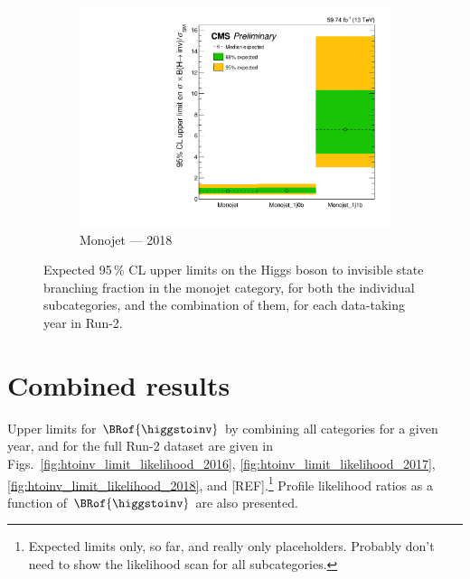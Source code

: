 \begin{figure}[htbp]
    \begin{subfigure}[b]{0.45\textwidth}
        \includegraphics[width=\textwidth]{figures/limits/monojet/limit_2018_monojet_Scenario4.pdf}
        \caption{Monojet --- 2018}
    \end{subfigure}
    \caption[Expected 95\,\% CL upper limits on the Higgs boson to invisible state branching fraction in the monojet category, for both the individual subcategories, and the combination of them, for each data-taking year in Run-2]{Expected 95\,\% CL upper limits on the Higgs boson to invisible state branching fraction in the monojet category, for both the individual subcategories, and the combination of them, for each data-taking year in Run-2.}
    \label{fig:htoinv_limit_monojet}
\end{figure}




\section{Combined results}
\label{sec:htoinv_combined_results}


Upper limits for $\BRof{\higgstoinv}$ by combining all categories for a given year, and for the full Run-2 dataset are given in Figs.~\ref{fig:htoinv_limit_likelihood_2016}, \ref{fig:htoinv_limit_likelihood_2017}, \ref{fig:htoinv_limit_likelihood_2018}, and [REF].\footnote{Expected limits only, so far, and really only placeholders. Probably don't need to show the likelihood scan for all subcategories.} Profile likelihood ratios as a function of $\BRof{\higgstoinv}$ are also presented. %

